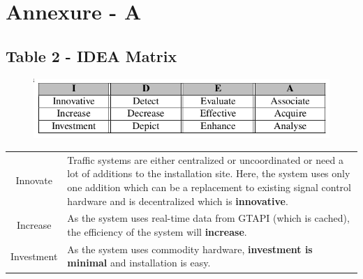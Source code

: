 \documentclass[12pt,a4paper,final]{report}
\DeclareRobustCommand{\gobblefive}[5]{}
\newcommand*{\SkipTocEntry}{\addtocontents{toc}{\gobblefive}}
\begin{document}

\SkipTocEntry\chapter{Annexure - A}
\thispagestyle{empty}
\newpage
\section*{Table 2 - IDEA Matrix}
\begin{figure}[!h]
	\includegraphics[scale=0.75]{IDEA_Matrix.png}
\end{figure}

\vspace*{2cm}

\begin{table}[!h]
	\centering
	\begin{Large}
	\begin{tabular}{| c | p{9cm} |}
		\toprule
		 Innovate & Traffic systems are either centralized or uncoordinated or need a lot of additions to the installation site. Here, the system uses only one addition which can be a replacement to existing signal control hardware and is decentralized which is \textbf{innovative}.\\
		Increase & As the system uses real-time data from GTAPI (which is cached), the efficiency of the system will \textbf{increase}.\\
		Investment & As the system uses commodity hardware, \textbf{investment is minimal} and installation is easy.\\
		\bottomrule
	\end{tabular}
	\end{Large}
\end{table}
\end{document}
